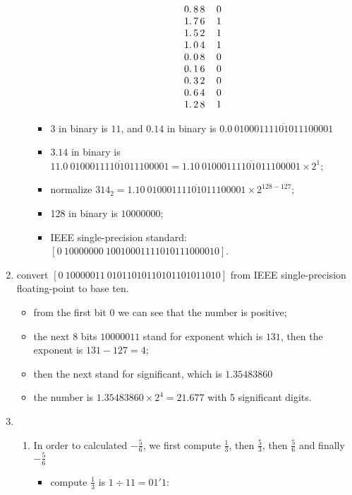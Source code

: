 \documentclass[11pt,twoside]{article}
\begin{document}
\begin{enumerate}[leftmargin=0pt]
\begin{enumerate}
\begin{itemize}[label = {}]
\[\begin{tabular}{c@{\,}c@{\,}c@{\,}c}
				  0. &8& 8&  \ \ \ 0\\
				  1. &7& 6&  \ \ \ 1\\
				  1. &5& 2&  \ \ \ 1\\
				 1. &0& 4&  \ \ \ 1\\
				 0. &0& 8&  \ \ \ 0\\
				 0. &1& 6&  \ \ \ 0\\
				0. &3& 2&  \ \ \ 0\\
				0. &6& 4&  \ \ \ 0\\
				1. &2& 8&  \ \ \ 1\\
					\end{tabular}\]
		\item  $3$ in binary is $11$, and $0.14$ in binary is $0.0 \ \overline{01000111101011100001}$
		\item $3.14$ in binary is $11.0 \ \overline{01000111101011100001} = 1.10 \ \overline{01000111101011100001} \times 2^1$;
		\item normalize $314_2 = 1.10 \ \overline{01000111101011100001} \times 2^{128-127} $;
		\item 128 in binary is $10000000$;
		\item IEEE single-precision standard: $[0 \ 10000000 \ 10 01000 11110 10111 00001 0 ]$.
		\end{itemize}
	\end{enumerate}
\item  convert $[0 \ 10000011 \ 01011 01011 01011 01011 010]$ from  IEEE single-precision floating-point to base ten.
	\begin{itemize}[label = {}]
	\item from the first bit $0$ we can see that the number is positive;
	\item the next 8 bits $10000011$ stand for exponent which is $131$, then the exponent is $131-127 = 4$;
	\item then the next stand for significant, which is $1.35483860$
	\item the number is $1.35483860 \times 2^4 = 21.677$ with 5 significant digits.
	\end{itemize}
\item
\begin{enumerate}
\item In order to calculated $-\frac{5}{6}$, we first compute $\frac{1}{3}$, then $\frac{5}{3}$, then $\frac{5}{6}$ and finally $-\frac{5}{6}$
\begin{itemize}[label = {}]
	\item  compute $\frac{1}{3}$ is $1 \div 11 = 01'1$:

\end{itemize}
\end{enumerate}
\end{enumerate}
\end{document}
